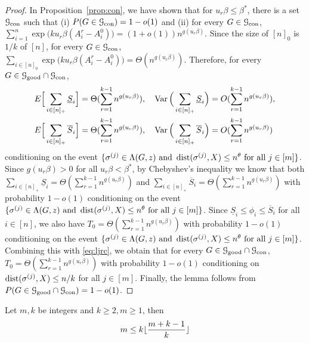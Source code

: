 \documentclass{article}
\begin{document}
\begin{proof}
	In Proposition~\ref{prop:con}, we have shown that for $ u_r \beta\le \beta^\ast$, there is a set $\mathcal{G}_{\operatorname{con}}$ such that (i) $P(G \in \mathcal{G}_{\operatorname{con}}) = 1-o(1)$ and (ii) for every $G\in \mathcal{G}_{\operatorname{con}}$, 
	$
	\sum_{i=1}^n \exp\big(k u_r \beta (A^r_i-A^0_i) \big)
	=(1+o(1)) n^{g( u_r \beta)} .
	$
    Since the size of $[n]_0$ is $1/k$ of $[n]$, for every $G\in \mathcal{G}_{\operatorname{con}}$, 
	$
	\sum_{i\in[n]_0} \exp\big(ku_r \beta (A^r_i-A^0_i) \big)
	=\Theta (n^{g(u_r \beta)}) .
	$
	Therefore, for every $G\in\mathcal{G}_{\operatorname{good}}\cap\mathcal{G}_{\operatorname{con}}$, 
	\begin{align*}
	& E \Big[ \sum_{i\in[n]_+}\underline{S}_i \Big] = \Theta(\sum_{r=1}^{k-1}n^{g(u_r \beta)}) , \quad
	\operatorname{Var} \Big( \sum_{i\in[n]_+}\underline{S}_i \Big) = O(\sum_{r=1}^{k-1} n^{g(u_r\beta)}) , \\
	& E \Big[ \sum_{i\in[n]_+}\overline{S}_i \Big] = \Theta(\sum_{r=1}^{k-1}n^{g(u_r\beta)}) , \quad
	\operatorname{Var} \Big( \sum_{i\in[n]_+}\overline{S}_i \Big) = O(\sum_{r=1}^{k-1} n^{g(u_r\beta)}) 
	\end{align*}
	conditioning on the event $\{\sigma^{(j)}\in  \Lambda(G, z)
	\text{~and~} \operatorname{dist}(\sigma^{(j)}, X) \le n^\theta
	\text{~for all~} j\in[m]\}$. Since $g(u_r\beta)> 0$ for all $u_r\beta< \beta^\ast$, by Chebyshev's inequality we know that both $\sum_{i\in[n]_+}\underline{S}_i=\Theta(\sum_{r=1}^{k-1}n^{g(u_r\beta)})$ and
	$\sum_{i\in[n]_+}\overline{S}_i=\Theta(\sum_{r=1}^{k-1} n^{g(u_r\beta)})$ with probability $1-o(1)$ conditioning on the event $\{\sigma^{(j)}\in  \Lambda(G, z)
	\text{~and~} \operatorname{dist}(\sigma^{(j)}, X) \le n^\theta
	\text{~for all~} j\in[m]\}$.
	Since $\underline{S}_i\le \phi_i\le \overline{S}_i$ for all $i\in[n]$, we also have $T_0=\Theta(\sum_{r=1}^{k-1}n^{g(u_r\beta)})$ with probability $1-o(1)$ conditioning on the event $\{\sigma^{(j)}\in  \Lambda(G, z)
	\text{~and~} \operatorname{dist}(\sigma^{(j)}, X) \le n^\theta
	\text{~for all~} j\in[m]\}$. Combining this with \eqref{eq:ljrc}, we obtain that for every $G\in\mathcal{G}_{\operatorname{good}}\cap\mathcal{G}_{\operatorname{con}}$,
	$T_0=\Theta(\sum_{r=1}^{k-1} n^{g(u_r\beta)})$ with probability $1-o(1)$ conditioning on $\operatorname{dist}(\sigma^{(j)}, X) \le n/k$ for all $j\in[m]$. Finally, the lemma follows from $P(G\in\mathcal{G}_{\operatorname{good}}\cap\mathcal{G}_{\operatorname{con}})=1-o(1)$.
\end{proof}
\begin{lemma}\label{lem:mk}
	Let $m,k$ be integers and $k\geq 2, m\geq 1$, then
	\begin{equation}\label{eq:m1}
	m  \leq  k \lfloor {m + k -1 \over k} \rfloor 
	\end{equation}
\end{lemma}
\end{document}
